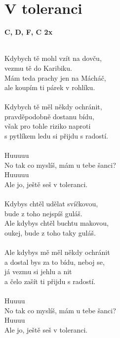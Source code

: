 \section{V toleranci}
\footnotesize\textbf{C, D\7, F, C 2x}\\
\\
\normalsize
\begin{multicols}{2}
\color{blue}
Kdybych tě mohl vzít na dovču,\\
vezmu tě do Karibiku.\\
Mám teda prachy jen na Mácháč,\\
ale koupím ti párek v rohlíku.\\
\\
Kdybych tě měl někdy ochránit,\\
pravděpodobně dostanu bídu,\\
však pro tohle riziko naproti\\
s pytlíkem ledu si přijdu s radostí.\\
\\
\color{black}
Huuuuu\\
\color{blue}
No tak co myslíš, mám u tebe šanci?\\
\color{black}
Huuuuu\\
\color{red}
Ale jo, ještě seš v toleranci.\\
\\
Kdybys chtěl udělat svíčkovou,\\
bude z toho nejspíš guláš.\\
Ale kdybys chtěl buchtu makovou,\\
oukej, bude z toho taky guláš.\\
\\
Ale kdybys mě měl někdy ochránit\\
a dostal bys za to bídu, neboj se,\\
já vezmu si jehlu a nit\\
a čelo zašít ti přijdu s radostí.\\
\\
\color{black}
Huuuu\\
\color{red}
No tak co myslíš, mám u tebe šanci?\\
\color{black}
Huuuu\\
\color{blue}
Ale jo, ještě seš v toleranci.\\
\columnbreak
\\

\end{multicols}
